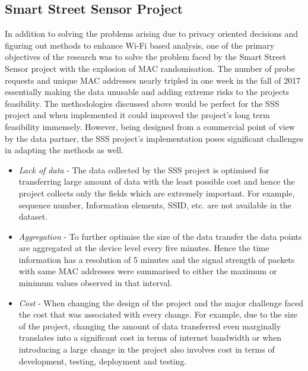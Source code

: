 \subsection{Smart Street Sensor Project}
In addition to solving the problems arising due to privacy oriented decisions and figuring out methods to enhance Wi-Fi based analysis, one of the primary objectives of the research was to solve the problem faced by the Smart Street Sensor project with the explosion of MAC randomisation.
The number of probe requests and unique MAC addresses nearly tripled in one week in the fall of 2017 essentially making the data unusable and adding extreme risks to the projects feasibility.
The methodologies discussed above would be perfect for the SSS project and when implemented it could improved the project's long term feasibility immensely.
However, being designed from a commercial point of view by the data partner, the SSS project's implementation poses significant challenges in adapting the methods as well.

\begin{itemize}
  \item \textit{Lack of data} - The data collected by the SSS project is optimised for transferring large amount of data with the least possible cost and hence the project collects only the fields which are extremely important. For example, sequence number, Information elements, SSID, etc. are not available in the dataset.
  \item \textit{Aggregation} - To further optimise the size of the data transfer the data points are aggregated at the device level every five minutes. Hence the time information has a resolution of 5 minutes and the signal strength of packets with same MAC addresses were summarised to either the maximum or minimum values observed in that interval.
  \item \textit{Cost} - When changing the design of the project and the major challenge faced the cost that was associated with every change. For example, due to the size of the project, changing the amount of data transferred even marginally translates into a significant cost in terms of internet bandwidth or when introducing a large change in the project also involves cost in terms of development, testing, deployment and testing.
\end{itemize}

